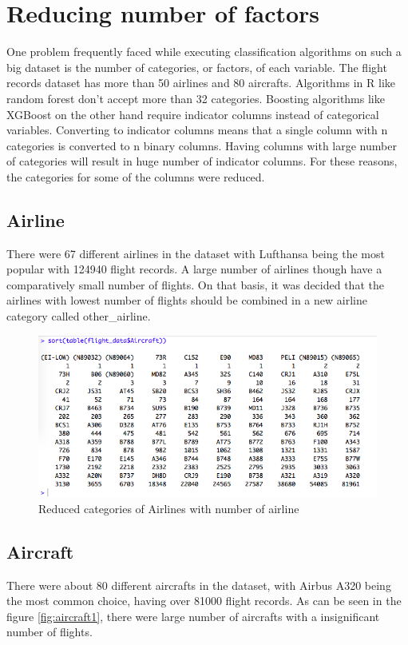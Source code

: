 \section{Reducing number of factors}
One problem frequently faced while executing classification algorithms on such a big dataset is the number of categories, or factors, of each variable. The flight records dataset has more than 50 airlines and 80 aircrafts. Algorithms in R like random forest don't accept more than 32 categories. Boosting algorithms like XGBoost on the other hand require indicator columns instead of categorical variables. Converting to indicator columns means that a single column with n categories is converted to n binary columns. Having columns with large number of categories will result in huge number of indicator columns. For these reasons, the categories for some of the columns were reduced.

\subsection{Airline}
There were 67 different airlines in the dataset with Lufthansa being the most popular with 124940 flight records. A large number of airlines though have a comparatively small number of flights. On that basis, it was decided that the airlines with lowest number of flights should be combined in a new airline category called other\_airline.

\begin{figure}[H]
    \centering
    \includegraphics[width=\textwidth]{Figures/Aircraft_orig_levels.png}
    \caption{Reduced categories of Airlines with number of airline}
    \label{fig:airline2}
\end{figure}

\subsection{Aircraft}
There were about 80 different aircrafts in the dataset, with Airbus A320 being the most common choice, having over 81000 flight records. As can be seen in the figure \ref{fig:aircraft1}, there were large number of aircrafts with a insignificant number of flights.

